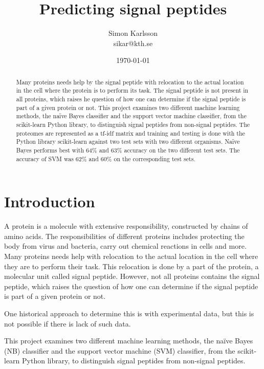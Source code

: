 \documentclass[10pt]{article}
\title{Predicting signal peptides}
\author{Simon Karlsson \\ sikar@kth.se}
\date{\today}
\begin{document}
\maketitle

\begin{abstract}
Many proteins needs help by the signal peptide with relocation to the actual location in the cell where the protein is to perform its task.
The signal peptide is not present in all proteins, which raises he question of how one can determine if the signal peptide is part of a given protein or not.
This project examines two different machine learning methods, the naïve Bayes classifier and the support vector machine classifier, from the scikit-learn Python library, to distinguish signal peptides from non-signal peptides.
The proteomes are represented as a tf-idf matrix and training and testing is done with the Python library scikit-learn against two test sets with two different organisms.
Naïve Bayes performs best with 64\% and 63\% accuracy on the two different test sets.
The accuracy of SVM was 62\% and 60\% on the corresponding test sets.
\end{abstract}

\newpage

\section{Introduction}
A protein is a molecule with extensive responsibility, constructed by chains of amino acids.
The responsibilities of different proteins includes protecting the body from virus and bacteria, carry out chemical reactions in cells and more\cite{website:ghr}.
Many proteins needs help with relocation to the actual location in the cell where they are to perform their task.
This relocation is done by a part of the protein, a molecular unit called signal peptide.
However, not all proteins contains the signal peptide\cite{website:project-description}, which raises the question of how one can determine if the signal peptide is part of a given protein or not.

One historical approach to determine this is with experimental data\cite{website:project-description}, but this is not possible if there is lack of such data.

This project examines two different machine learning methods, the naïve Bayes (NB) classifier and the support vector machine (SVM) classifier, from the scikit-learn Python library, to distinguish signal peptides from non-signal peptides.
\end{document}
